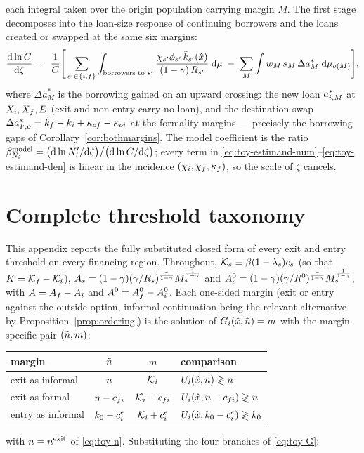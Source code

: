 \documentclass[12pt]{article}
\begin{document}
each integral taken over the origin population carrying margin $M$.
The first stage decomposes into the loan-size response of continuing
borrowers and the loans created or swapped at the same six margins:
\begin{equation}
  \frac{\mathrm{d}\ln C}{\mathrm{d}\zeta}
  \;=\;
  \frac{1}{C}\Bigg[
  \sum_{s'\in\{i,f\}}
  \int_{\text{borrowers to }s'}
  \frac{\chi_{s'}\phi_{s'}\,\tilde k_{s'}(\hat x)}
       {(1-\gamma)\,R_{s'}}\;\mathrm{d}\mu
  \;-\;
  \sum_{M}\int w_{M}\,s_{M}\,\Delta a^{*}_{M}\;\mathrm{d}\mu_{o(M)}
  \Bigg],
  \label{eq:toy-estimand-den}
\end{equation}
where $\Delta a^{*}_{M}$ is the borrowing gained on an upward
crossing: the new loan $a^{*}_{i,M}$ at $X_{i},X_{f},E$
(exit and non-entry carry no loan), and the destination swap
$\Delta a^{*}_{F,o}
=\tilde k_{f}-\tilde k_{i}+\kappa_{of}-\kappa_{oi}$
at the formality margins --- precisely the borrowing gaps of
Corollary~\ref{cor:bothmargins}. The model coefficient is the ratio
$\beta^{\text{model}}_{N_{i}}
=\big(\mathrm{d}\ln N'_{i}/\mathrm{d}\zeta\big)\big/
\big(\mathrm{d}\ln C/\mathrm{d}\zeta\big)$; every term in
\eqref{eq:toy-estimand-num}--\eqref{eq:toy-estimand-den} is linear in
the incidence $(\chi_{i},\chi_{f},\kappa_{f})$, so the
scale of $\zeta$ cancels.

\section{Complete threshold taxonomy}
\label{app:toy-taxonomy}
 
This appendix reports the fully substituted closed form of every
exit and entry threshold on every financing region. Throughout,
$\mathcal{K}_{s}\equiv\beta(1-\lambda_{s})c_{s}$ (so that
$K=\mathcal{K}_{f}-\mathcal{K}_{i}$),
$A_{s}=(1-\gamma)(\gamma/R_{s})^{\frac{\gamma}{1-\gamma}}
M_{s}^{\frac{1}{1-\gamma}}$ and
$A^{0}_{s}=(1-\gamma)(\gamma/R^{0})^{\frac{\gamma}{1-\gamma}}
M_{s}^{\frac{1}{1-\gamma}}$, with $A=A_{f}-A_{i}$ and
$A^{0}=A^{0}_{f}-A^{0}_{i}$. Each one-sided margin (exit or
entry against the outside option, informal continuation being the
relevant alternative by Proposition~\ref{prop:ordering}) is the
solution of $G_{i}(\hat{x},\tilde{n})=m$ with the
margin-specific pair $(\tilde{n},m)$:
\begin{center}
\renewcommand{\arraystretch}{1.35}
\begin{tabular}{lccl}
\hline
margin & $\tilde{n}$ & $m$ & comparison \\
\hline
exit as informal & $n$ & $\mathcal{K}_{i}$
  & $U_{i}(\hat{x},n)\gtrless n$ \\
exit as formal & $n-c_{fi}$ & $\mathcal{K}_{i}+c_{fi}$
  & $U_{i}(\hat{x},n-c_{fi})\gtrless n$ \\
entry as informal & $k_{0}-c^{e}_{i}$ & $\mathcal{K}_{i}+c^{e}_{i}$
  & $U_{i}(\hat{x},k_{0}-c^{e}_{i})\gtrless k_{0}$ \\
\hline
\end{tabular}
\end{center}
with $n=n^{\text{exit}}$ of \eqref{eq:toy-n}. Substituting the
four branches of \eqref{eq:toy-G}:
 
\end{document}

